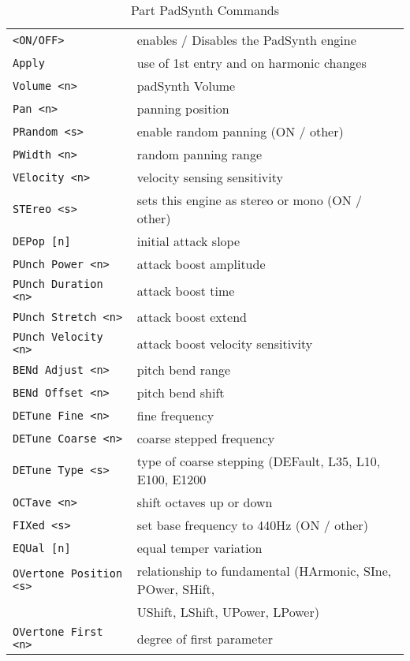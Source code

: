    \begin{table}[H]
      \centering
      \caption{Part PadSynth Commands}
      \label{table:yoshimi_part_padsynth_commands}
      \begin{tabular}{l l}
\texttt{<ON/OFF>} &
   enables / Disables the PadSynth engine \\
\texttt{Apply} &
   use of 1st entry and on harmonic changes \\
\texttt{Volume <n>} &
   padSynth Volume \\
\texttt{Pan <n>} &
   panning position \\
\texttt{PRandom <s>} &
   enable random panning (ON / other) \\
\texttt{PWidth <n>} &
   random panning range \\
\texttt{VElocity <n>} &
   velocity sensing sensitivity \\
\texttt{STEreo <s>} &
   sets this engine as stereo or mono (ON / other) \\
\texttt{DEPop [n]} &
   initial attack slope \\
\texttt{PUnch Power <n>} &
   attack boost amplitude \\
\texttt{PUnch Duration <n>} &
   attack boost time \\
\texttt{PUnch Stretch <n>} &
   attack boost extend \\
\texttt{PUnch Velocity <n>} &
   attack boost velocity sensitivity \\
\texttt{BENd Adjust <n>} &
   pitch bend range \\
\texttt{BENd Offset <n>} &
   pitch bend shift \\
\texttt{DETune Fine <n>} &
   fine frequency \\
\texttt{DETune Coarse <n>} &
   coarse stepped frequency \\
\texttt{DETune Type <s>} &
   type of coarse stepping (DEFault, L35, L10, E100, E1200 \\
\texttt{OCTave <n>} &
   shift octaves up or down \\
\texttt{FIXed <s>} &
   set base frequency to 440Hz (ON / other) \\
\texttt{EQUal [n]} &
   equal temper variation \\
\texttt{OVertone Position <s>} &
   relationship to fundamental (HArmonic, SIne, POwer, SHift, \\
\texttt{} &
   UShift, LShift, UPower, LPower) \\
\texttt{OVertone First <n>} &
   degree of first parameter \\

\end{tabular}
\end{table}
